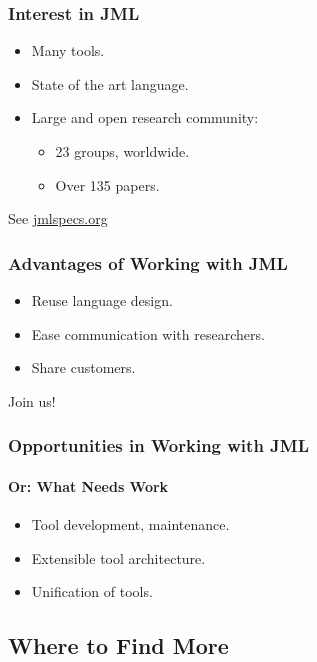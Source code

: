 \begin{frame}
\frametitle{Interest in JML}

\begin{itemize}
\item
Many tools.

\item
State of the art language.

\item
Large and open research community:
\begin{itemize}
\item
23 groups, worldwide.

\item
Over 135 papers.
\end{itemize}
\end{itemize}

See \href{https://www.jmlspecs.org}{jmlspecs.org}
\end{frame}

\begin{frame}[label=advantages]
\frametitle{Advantages of Working with JML}

\begin{itemize}
\item
Reuse language design.

\item
Ease communication with researchers.

\item
Share customers.
\end{itemize}

Join us!
\end{frame}

\begin{frame}[label=opportunities]
\frametitle{Opportunities in Working with JML}
\framesubtitle{Or: What Needs Work}

\begin{itemize}
\item
Tool development, maintenance.

\item
Extensible tool architecture.

\item
Unification of tools.
\end{itemize}
\end{frame}

\subsection[Finding More]{Where to Find More}

